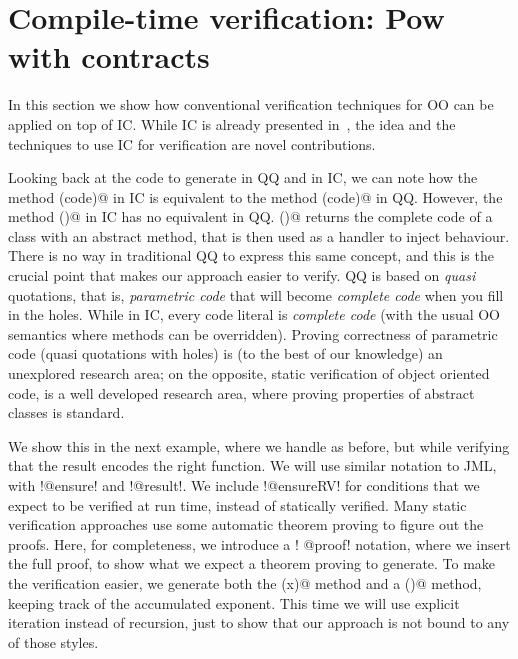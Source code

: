 \section{Compile-time verification: Pow with contracts}
\label{s:verification}
In this section we show how conventional verification techniques for OO can be applied on top of IC.
While IC is already presented in~\cite{servetto2014meta},
the idea and the techniques to use IC for verification are novel contributions.

Looking back at the code to generate \Q@pow@ in QQ and in IC,
we can
note how the method \Q@inductive(code)@ in IC is equivalent to the method
\Q@inductive(code)@ in QQ.
However,
the method \Q@inductive()@ in IC has no equivalent in QQ.
\Q@inductive()@ returns the complete code of a class with an abstract method,
that is then used as a handler to inject behaviour.
There is no way in traditional QQ to express this same concept,
and this is the crucial point that makes our approach easier to verify.
QQ is based on \emph{quasi} quotations, that is, \emph{parametric code} that
will become \emph{complete code} when you fill in the holes.
While in IC, every code literal is \emph{complete code} (with
the usual OO semantics where methods can be overridden).
Proving correctness of parametric code (quasi quotations with holes)
is (to the best of our knowledge) an unexplored research area;
on the opposite, static verification of object oriented code,
is a well developed research area, where proving properties
of abstract classes is standard.

We show this in the next example, where we handle \Q@pow@ as before, but while verifying that the
result encodes the right \Q@pow@ function. We will use similar notation to JML, with \Q!@ensure! and \Q!@result!.
We include \Q!@ensureRV! for conditions that we expect to be verified at run time, instead of statically verified.
Many static verification approaches use some automatic theorem proving to figure out the proofs. Here, for completeness, we introduce a 
\Q! @proof! notation, where we insert the full proof, to show what we expect a theorem proving to generate.
To make the verification easier, we generate both the \Q@pow(x)@ method
and a \Q@exp()@ method, keeping track of the accumulated exponent.
This time we will use explicit iteration instead of recursion, just to show that our approach is not bound to any of those styles.
\newcommand\thisExp{\ensuremath{{}^{\textbf{this.exp()}}}}
\newcommand\thisSuperExp{\ensuremath{{}^{\textbf{this.superExp()}}}}
\newcommand\oneThisSuperExp{\ensuremath{{}^{\textbf{1+this.superExp()}}}}
\newcommand\powerY{\ensuremath{{}^{\textbf{y}}}}


